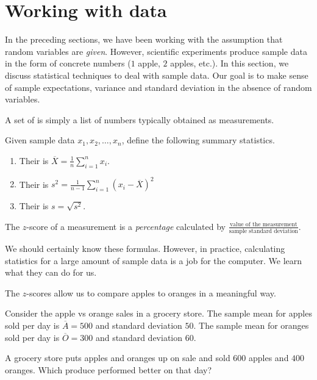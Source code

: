 \documentclass[../main.tex]{subfiles}
\begin{document}
 \section{Working with data}

In the preceding sections, we have been working with the assumption that random variables are \emph{given}.  However, scientific experiments produce sample data in the form of concrete numbers (\(1\) apple, \(2\) apples, etc.).  In this section, we discuss statistical techniques to deal with sample data.  Our goal is to make sense of sample expectations, variance and standard deviation in the absence of random variables. 

\begin{definition}
  A set of  is simply a list of numbers typically obtained as measurements.

  Given sample data \(x_{1}, x_{2}, \ldots, x_{n}\), define the following summary statistics.
  \begin{enumerate}
    \item Their  is \(\overline{X} = \frac{1}{n} \sum_{i=1}^{n} x_{i}\).

    \item Their  is \(s^{2} = \frac{1}{n-1} \sum_{i=1}^{n} \left( x_{i} - \overline{X} \right)^{2}\)

    \item Their  is \(s = \sqrt{s^{2}}\).
  \end{enumerate}

  \medskip
  The \(z\)-score of a measurement is a \emph{percentage} calculated by \(\frac{\text{value of the measurement}}{\text{sample standard deviation}}\).
\end{definition}

We should certainly know these formulas.  However, in practice, calculating statistics for a large amount of sample data is a job for the computer.  We learn what they can do for us.  

The \(z\)-scores allow us to compare apples to oranges in a meaningful way.
\begin{example}
  Consider the apple vs orange sales in a grocery store. The sample mean for apples sold per day is \(\overline{A} = 500\) and standard deviation \(50\). The sample mean for oranges sold per day is \(\overline{O} = 300\) and standard deviation \(60\). 

  A grocery store puts apples and oranges up on sale and sold \(600\) apples and \(400\) oranges.  Which produce performed better on that day?

\end{example}
\clearpage
\end{document}
